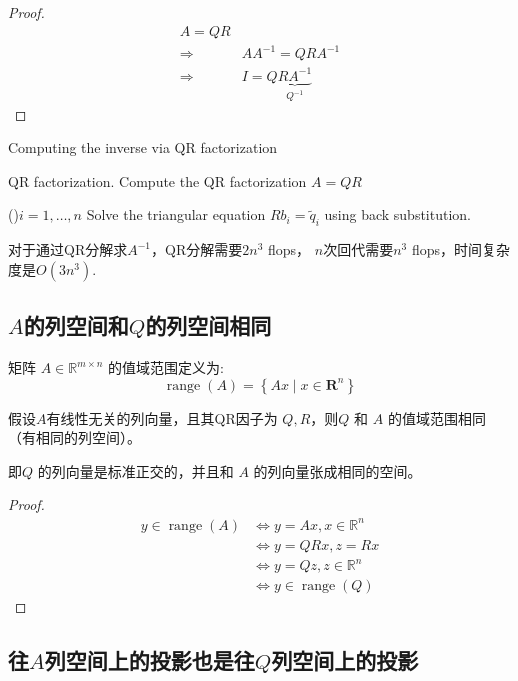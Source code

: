 \begin{proof}
    $$\begin{aligned}
        A = QR\\
        \Rightarrow & A A^{-1} = QRA^{-1}\\
        \Rightarrow & I = Q\underbrace{RA^{-1} }_{Q^{-1}}
    \end{aligned}$$
\end{proof}

\begin{algorithm}[htbp]
    \caption{Computing the inverse via QR factorization}

    QR factorization. Compute the QR factorization $ A=Q R $\;

    \For(){$ i=1, \ldots, n $}{
        Solve the triangular equation $ R b_{i}=\tilde{q}_{i} $ using back substitution.
    }
\end{algorithm}

对于通过QR分解求$A^{-1}$，QR分解需要$2n^3$ flops， $n$次回代需要$n^3$ flops，时间复杂度是$O(3n^3)$.

\subsection{$A$的列空间和$Q$的列空间相同}

矩阵 $A \in \mathbb{R}^{m \times n}$ 的值域范围定义为:
$$
\operatorname{range}(A)=\left\{A x \mid x \in \mathbf{R}^{n}\right\}
$$

\begin{theorem}
    假设$A$有线性无关的列向量，且其QR因子为 $Q, R$，则$Q$ 和 $A$ 的值域范围相同（有相同的列空间）。

\end{theorem}

即$Q$ 的列向量是标准正交的，并且和 $A$ 的列向量张成相同的空间。

\begin{proof}
    $$
\begin{aligned}
y \in \operatorname{range}(A) & \Leftrightarrow  y=A x, x \in \mathbb{R}^{n} \\
& \Leftrightarrow  y=Q R x, z=R x \\
& \Leftrightarrow  y=Q z, z \in \mathbb{R}^{n} \\
& \Leftrightarrow  y \in \operatorname{range}(Q)
\end{aligned}
$$
\end{proof}

\subsection{往$A$列空间上的投影也是往$Q$列空间上的投影}

